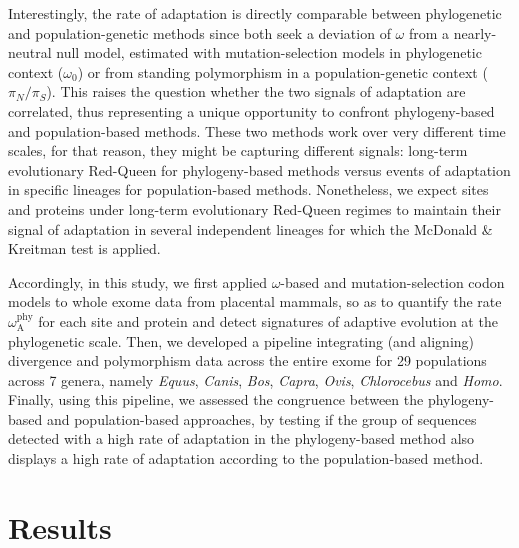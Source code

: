 \documentclass{article}
\newcommand{\rateApop}{\omega_{\mathrm{A}}}
\newcommand{\rateAphy}{\rateApop^{\mathrm{phy}}}
\newcommand{\pn}{\pi_N}
\newcommand{\ps}{\pi_S}
\newcommand{\pnps}{\pn / \ps}
\begin{document}
    Interestingly, the rate of adaptation is directly comparable between phylogenetic and population-genetic methods since both seek a deviation of $\omega$  from a nearly-neutral null model, estimated with mutation-selection models in phylogenetic context ($\omega_{0}$) or from standing polymorphism in a population-genetic context ($\pnps$).
    This raises the question whether the two signals of adaptation are correlated, thus representing a unique opportunity to confront phylogeny-based and population-based methods.
    These two methods work over very different time scales, for that reason, they might be capturing different signals: long-term evolutionary Red-Queen for phylogeny-based methods versus events of adaptation in specific lineages for population-based methods.
    Nonetheless, we expect sites and proteins under long-term evolutionary Red-Queen regimes to maintain their signal of adaptation in several independent lineages for which the McDonald \& Kreitman test is applied.

    Accordingly, in this study, we first applied $\omega$-based and mutation-selection codon models to whole exome data from placental mammals, so as to quantify the rate $\rateAphy$ for each site and protein and detect signatures of adaptive evolution at the phylogenetic scale.
    Then, we developed a pipeline integrating (and aligning) divergence and polymorphism data across the entire exome for 29 populations across 7 genera, namely \textit{Equus}, \textit{Canis}, \textit{Bos}, \textit{Capra}, \textit{Ovis}, \textit{Chlorocebus} and \textit{Homo}.
    Finally, using this pipeline, we assessed the congruence between the phylogeny-based and population-based approaches, by testing if the group of sequences detected with a high rate of adaptation in the phylogeny-based method also displays a high rate of adaptation according to the population-based method.

    \section*{Results}\label{sec:results}
\end{document}
